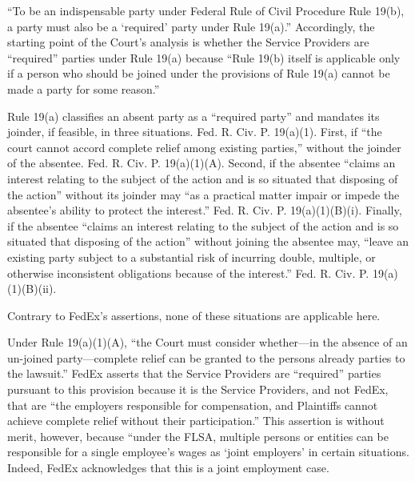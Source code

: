 \documentclass[11pt,letterpaper,twoside]{article}
\begin{document}
``To be an indispensable party under Federal Rule of Civil Procedure
Rule 19(b), a party must also be a `required' party under Rule 19(a).''
Accordingly, the starting point of the Court's analysis is whether the
Service Providers are ``required'' parties under Rule 19(a) because
``Rule 19(b) itself is applicable only if a person who should be joined
under the provisions of Rule 19(a) cannot be made a party for some
reason.''

Rule 19(a) classifies an absent party as a ``required party'' and
mandates its joinder, if feasible, in three situations. Fed. R. Civ. P.
19(a)(1). First, if ``the court cannot accord complete relief among
existing parties,'' without the joinder of the absentee. Fed. R. Civ. P.
19(a)(1)(A). Second, if the absentee ``claims an interest relating to
the subject of the action and is so situated that disposing of the
action'' without its joinder may ``as a practical matter impair or
impede the absentee's ability to protect the interest.'' Fed. R. Civ. P.
19(a)(1)(B)(i). Finally, if the absentee ``claims an interest relating
to the subject of the action and is so situated that disposing of the
action'' without joining the absentee may, ``leave an existing party
subject to a substantial risk of incurring double, multiple, or
otherwise inconsistent obligations because of the interest.'' Fed. R.
Civ. P. 19(a)(1)(B)(ii).

Contrary to FedEx's assertions, none of these situations are applicable
here.

Under Rule 19(a)(1)(A), ``the Court must consider whether---in the
absence of an un-joined party---complete relief can be granted to the
persons already parties to the lawsuit.'' FedEx asserts that the Service
Providers are ``required'' parties pursuant to this provision because it
is the Service Providers, and not FedEx, that are ``the employers
responsible for compensation, and Plaintiffs cannot achieve complete
relief without their participation.'' This assertion is without merit,
however, because ``under the FLSA, multiple persons or entities can be
responsible for a single employee's wages as `joint employers' in
certain situations. Indeed, FedEx acknowledges that this is a joint
employment case.
\end{document}
